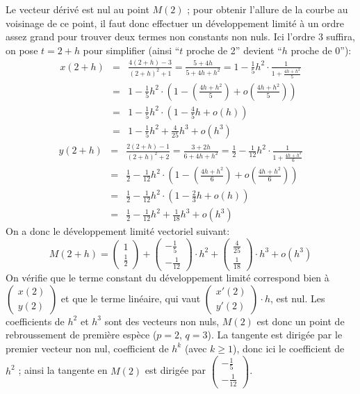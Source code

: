 {{Le vecteur dérivé est nul au point $M(2)$ ; 
pour obtenir l'allure de la courbe au voisinage de ce point,
il faut donc effectuer un développement limité à un 
ordre assez grand pour trouver deux termes non constants non nuls. 
Ici l'ordre 3 suffira, on pose $t=2+h$ pour simplifier 
(ainsi ``$t$ proche de 2'' devient ``$h$ proche de 0''):
\begin{eqnarray*}
x(2+h)&=&\frac{4(2+h)-3}{(2+h)^2+1}=\frac{5+4h}{5+4h+h^2}=1-\frac{1}{5}h^2\cdot\frac{1}{1+\frac{4h+h^2}{5}}\\
 &=&1-\frac{1}{5}h^2\cdot\left(1-\left(\frac{4h+h^2}{5}\right)+o\left(\frac{4h+h^2}{5}\right)\right)\\
 &=&1-\frac{1}{5}h^2\cdot\left(1-\frac{4}{5}h+o(h)\right)\\
 &=&1-\frac{1}{5}h^2+\frac{4}{25}h^3+o(h^3)
\end{eqnarray*}
\begin{eqnarray*}
y(2+h)&=&\frac{2(2+h)-1}{(2+h)^2+2}=\frac{3+2h}{6+4h+h^2}=\frac{1}{2}-\frac{1}{12}h^2\cdot\frac{1}{1+\frac{4h+h^2}{6}}\\
 &=&\frac{1}{2}-\frac{1}{12}h^2\cdot\left(1-\left(\frac{4h+h^2}{6}\right)+o\left(\frac{4h+h^2}{6}\right)\right)\\
 &=&\frac{1}{2}-\frac{1}{12}h^2\cdot\left(1-\frac{2}{3}h+o(h)\right)\\
 &=&\frac{1}{2}-\frac{1}{12}h^2+\frac{1}{18}h^3+o(h^3)
\end{eqnarray*}
On a donc le développement limité vectoriel suivant:
$$M(2+h)=\begin{pmatrix}1\\ \frac{1}{2}\end{pmatrix}
+\begin{pmatrix}-\frac{1}{5}\\-\frac{1}{12}\end{pmatrix}\cdot h^2+
\begin{pmatrix}\frac{4}{25}\\  \frac{1}{18}\end{pmatrix}\cdot h^3+o(h^3)$$
On vérifie que le terme constant du développement limité correspond bien à 
$\begin{pmatrix}x(2)\\ y(2)\end{pmatrix}$ et que le terme linéaire, 
qui vaut $\begin{pmatrix}x'(2)\\ y'(2)\end{pmatrix}\cdot h$, est nul. 
Les coefficients de $h^2$ et $h^3$ sont des vecteurs non nuls, $M(2)$ 
est donc un point de rebroussement de première espèce ($p=2$, $q=3$).
La tangente est dirigée par le premier vecteur 
non nul, coefficient de $h^k$ (avec $k\ge1$), donc ici
le coefficient de $h^2$ ; ainsi la tangente en $M(2)$ est dirigée par 
$\left(\begin{smallmatrix}-\frac{1}{5}\\ -\frac{1}{12}\end{smallmatrix}\right)$.


}}
